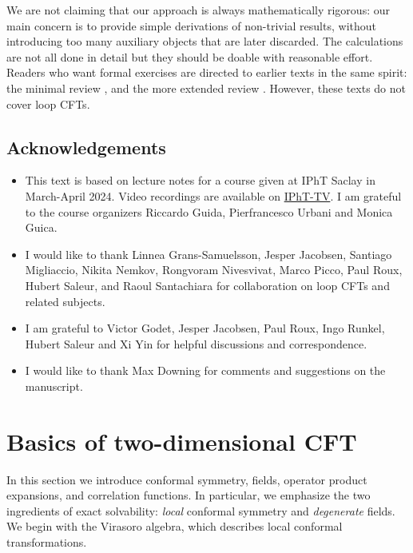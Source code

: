 \documentclass[12pt, a4paper]{article}
\theoremstyle{break}
\begin{document}
We are not claiming that our approach is always mathematically rigorous: our main concern is to provide simple derivations of non-trivial results, without introducing too many auxiliary objects that are later discarded. The calculations are not all done in detail but they should be doable with reasonable effort. Readers who want formal exercises are directed to earlier texts in the same spirit: the minimal review \cite{rib16}, and the more extended review \cite{rib14}. However, these texts do not cover loop CFTs.


\subsection*{Acknowledgements}

\begin{itemize}
 \item This text is based on lecture notes for a course given at IPhT Saclay in March-April 2024. Video recordings are available on \href{https://www.youtube.com/playlist?list=PLrLctLPAdPNtD7yFOcfdNx2J-A_CE1svr}{IPhT-TV}. I am grateful to the course organizers Riccardo Guida, Pierfrancesco Urbani and Monica Guica. 
 \item I would like to thank Linnea Grans-Samuelsson, Jesper Jacobsen, Santiago Migliaccio, Nikita Nemkov, Rongvoram Nivesvivat, Marco Picco, Paul Roux, Hubert Saleur, and Raoul Santachiara for collaboration on loop CFTs and related subjects. 
 \item I am grateful to Victor Godet, Jesper Jacobsen, Paul Roux, Ingo Runkel, Hubert Saleur and Xi Yin for helpful discussions and correspondence. 
 \item I would like to thank Max Downing for comments and suggestions on the manuscript. 
\end{itemize}



\section{Basics of two-dimensional CFT}\label{sec:bo}

In this section we introduce conformal symmetry, fields, operator product expansions, and correlation functions. In particular, we emphasize the two ingredients of exact solvability: \textit{local} conformal symmetry and \textit{degenerate} fields. We begin with the Virasoro algebra, which describes local conformal transformations. 
\end{document}
